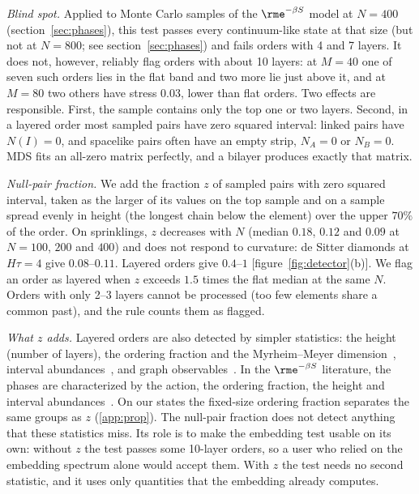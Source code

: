 \documentclass[12pt]{iopart}
\begin{document}
\emph{Blind spot.} Applied to Monte Carlo samples of the $\rme^{-\beta S}$ model at $N=400$ (section~\ref{sec:phases}), this test passes every continuum-like state at that size (but not at $N=800$; see section~\ref{sec:phases}) and fails orders with 4 and 7 layers. It does not, however, reliably flag orders with about 10 layers: at $M=40$ one of seven such orders lies in the flat band and two more lie just above it, and at $M=80$ two others have stress $0.03$, lower than flat orders. Two effects are responsible. First, the sample contains only the top one or two layers. Second, in a layered order most sampled pairs have zero squared interval: linked pairs have $N(I)=0$, and spacelike pairs often have an empty strip, $N_A=0$ or $N_B=0$. MDS fits an all-zero matrix perfectly, and a bilayer produces exactly that matrix.

\emph{Null-pair fraction.} We add the fraction $z$ of sampled pairs with zero squared interval, taken as the larger of its values on the top sample and on a sample spread evenly in height (the longest chain below the element) over the upper $70\%$ of the order. On sprinklings, $z$ decreases with $N$ (median $0.18$, $0.12$ and $0.09$ at $N=100$, $200$ and $400$) and does not respond to curvature: de Sitter diamonds at $H\tau=4$ give $0.08$--$0.11$. Layered orders give $0.4$--$1$ [figure~\ref{fig:detector}(b)]. We flag an order as layered when $z$ exceeds $1.5$ times the flat median at the same $N$. Orders with only 2--3 layers cannot be processed (too few elements share a common past), and the rule counts them as flagged.

\emph{What $z$ adds.} Layered orders are also detected by simpler statistics: the height (number of layers), the ordering fraction and the Myrheim--Meyer dimension~\cite{Myrheim78,Meyer88}, interval abundances~\cite{GlaserSurya13}, and graph observables~\cite{EMLW26}. In the $\rme^{-\beta S}$ literature, the phases are characterized by the action, the ordering fraction, the height and interval abundances~\cite{Surya12,GOS18,GlaserSurya16,Glaser18,Glaser23}. On our states the fixed-size ordering fraction separates the same groups as $z$ (\ref{app:prop}). The null-pair fraction does not detect anything that these statistics miss. Its role is to make the embedding test usable on its own: without $z$ the test passes some 10-layer orders, so a user who relied on the embedding spectrum alone would accept them. With $z$ the test needs no second statistic, and it uses only quantities that the embedding already computes.
\end{document}
